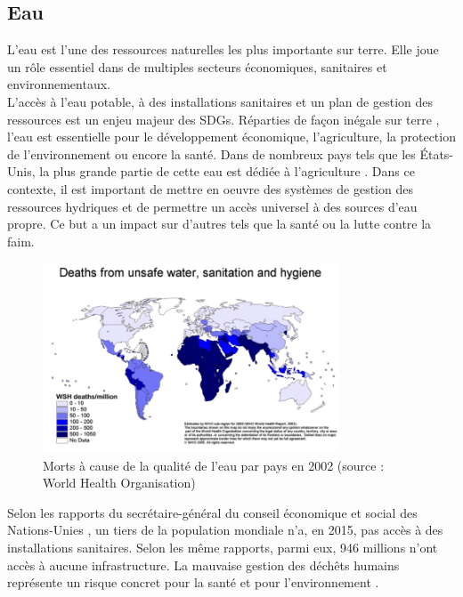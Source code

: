 \documentclass[10pt, article]{llncs}
\begin{document}
	\subsection{Eau}
			L'eau est l'une des ressources naturelles les plus importante sur terre. Elle joue un rôle essentiel dans de multiples secteurs économiques, sanitaires et environnementaux.\\
			L'accès à l'eau potable, à des installations sanitaires et un plan de gestion des ressources est un enjeu majeur des SDGs. Réparties de façon inégale sur terre \cite{lefevre_repartition_nodate}
			, l'eau est essentielle pour le développement économique, l'agriculture, la protection de l'environnement ou encore la santé. Dans de nombreux pays tels que les États-Unis, la plus grande partie de cette eau est dédiée à l'agriculture \cite{world_business_council_for_sustainable_development_global_nodate}.
			Dans ce contexte, il est important de mettre en oeuvre des systèmes de gestion des ressources hydriques et de permettre un accès universel à des sources d'eau propre. Ce but a un impact sur d'autres tels que la santé ou la lutte contre la faim.
			\begin{figure}
				\begin{center}
					\includegraphics[width=250pt]{img/water_deaths_2002.png}
				\end{center}
				\caption{Morts à cause de la qualité de l'eau par pays en 2002 (source : World Health Organisation)}
			\end{figure}
			Selon les rapports du secrétaire-général du conseil économique et social des Nations-Unies \cite{united_nations_economic_and_social_council_progress_2017}\cite{united_nations_economic_and_social_council_progress_2017-1}, un tiers de la population mondiale n'a, en 2015, pas accès à des installations sanitaires. Selon les même rapports, parmi eux, 946 millions n'ont accès à aucune infrastructure. La mauvaise gestion des déchêts humains représente un risque concret pour la santé et pour l'environnement \cite{ashbolt_microbial_2004}.\\
\end{document}
